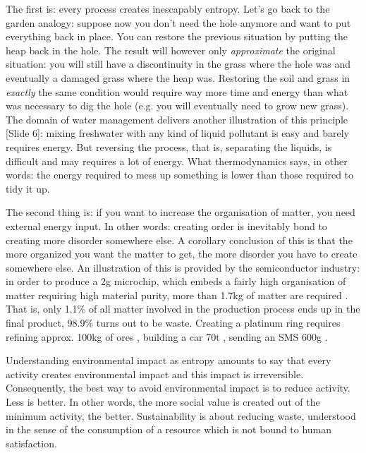 \documentclass{article}
\begin{document}
The first is: every process creates inescapably entropy. Let's go back to the garden analogy: suppose now you don't need the hole anymore and want to put everything back in place. You can restore the previous situation by putting the heap back in the hole. The result will however only \emph{approximate} the original situation: you will still have a discontinuity in the grass where the hole was and eventually a damaged grass where the heap was. Restoring the soil and grass in \emph{exactly} the same condition would require way more time and energy than what was necessary to dig the hole (e.g. you will eventually need to grow new grass). The domain of water management delivers another illustration of this principle {\color{blue}[Slide 6]}: mixing freshwater with any kind of liquid pollutant is easy and barely requires energy. But reversing the process, that is, separating the liquids, is difficult and may requires a lot of energy. What thermodynamics says, in other words: the energy required to mess up something is lower than those required to tidy it up.

The second thing is: if you want to increase the organisation of matter, you need external energy input. In other words: creating order is inevitably bond to creating more disorder somewhere else. A corollary conclusion of this is that the more organized you want the matter to get, the more disorder you have to create somewhere else. An illustration of this is provided by the semiconductor industry: in order to produce a 2g microchip, which embeds a fairly high organisation of matter requiring high material purity, more than 1.7kg of matter are required \cite{williamsKilogramMicrochipEnergy2002}. That is, only 1.1\% of all matter involved in the production process ends up in the final product, 98.9\% turns out to be waste. Creating a platinum ring requires refining approx. 100kg of ores \cite{erkmanVersEcologieIndustrielle2004}, building a car 70t \cite{janinDemarcheEcoconceptionEntreprise2000}, sending an SMS 600g \cite{federico2001mips}.

Understanding environmental impact as entropy amounts to say that every activity creates environmental impact and this impact is irreversible. Consequently, the best way to avoid environmental impact is to reduce activity. Less is better. In other words, the more social value is created out of the minimum activity, the better. Sustainability is about reducing waste, understood in the sense of the consumption of a resource which is not bound to human satisfaction.
\end{document}
